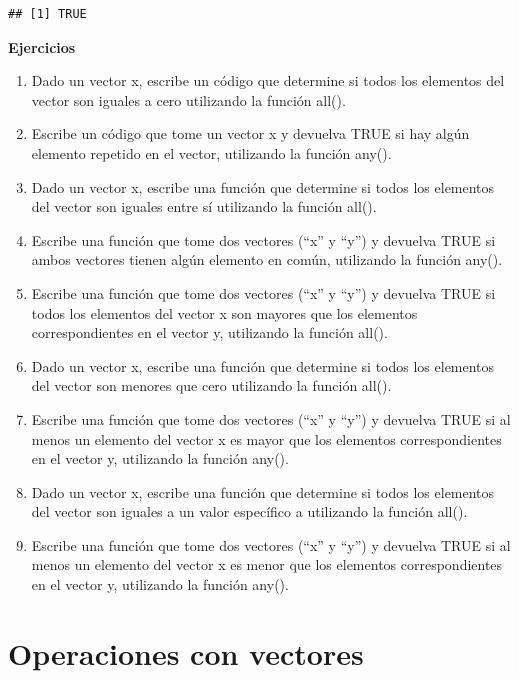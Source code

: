 \documentclass[
]{book}
\providecommand{\tightlist}{%
  \setlength{\itemsep}{0pt}\setlength{\parskip}{0pt}}
\begin{document}
\begin{verbatim}
## [1] TRUE
\end{verbatim}

\textbf{Ejercicios}

\begin{enumerate}
\def\labelenumi{\arabic{enumi}.}
\tightlist
\item
  Dado un vector x, escribe un código que determine si todos los elementos del vector son iguales a cero utilizando la función all().
\item
  Escribe un código que tome un vector x y devuelva TRUE si hay algún elemento repetido en el vector, utilizando la función any().
\item
  Dado un vector x, escribe una función que determine si todos los elementos del vector son iguales entre sí utilizando la función all().
\item
  Escribe una función que tome dos vectores (``x'' y ``y'') y devuelva TRUE si ambos vectores tienen algún elemento en común, utilizando la función any().
\item
  Escribe una función que tome dos vectores (``x'' y ``y'') y devuelva TRUE si todos los elementos del vector x son mayores que los elementos correspondientes en el vector y, utilizando la función all().
\item
  Dado un vector x, escribe una función que determine si todos los elementos del vector son menores que cero utilizando la función all().
\item
  Escribe una función que tome dos vectores (``x'' y ``y'') y devuelva TRUE si al menos un elemento del vector x es mayor que los elementos correspondientes en el vector y, utilizando la función any().
\item
  Dado un vector x, escribe una función que determine si todos los elementos del vector son iguales a un valor específico a utilizando la función all().
\item
  Escribe una función que tome dos vectores (``x'' y ``y'') y devuelva TRUE si al menos un elemento del vector x es menor que los elementos correspondientes en el vector y, utilizando la función any().
\end{enumerate}

\hypertarget{operaciones-con-vectores}{%
\section{Operaciones con vectores}\label{operaciones-con-vectores}}
\end{document}
